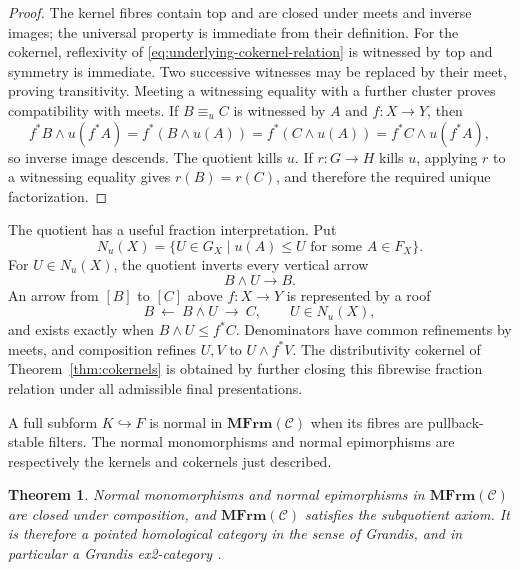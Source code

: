 \documentclass[12pt,oneside,reqno]{amsart}
\newtheorem{theorem}{Theorem}[section]
\theoremstyle{definition}
\theoremstyle{remark}
\newcommand{\C}{\mathcal C}
\newcommand{\MFrm}{\mathbf{MFrm}}
\begin{document}
\begin{proof}
The kernel fibres contain top and are closed under meets and inverse
images; the universal property is immediate from their definition.
For the cokernel, reflexivity of \eqref{eq:underlying-cokernel-relation}
is witnessed by top and symmetry is immediate.  Two successive
witnesses may be replaced by their meet, proving transitivity.  Meeting
a witnessing equality with a further cluster proves compatibility with
meets.  If \(B\equiv_uC\) is witnessed by \(A\) and \(f:X\to Y\), then
\[
 f^*B\wedge u(f^*A)
 =f^*(B\wedge u(A))
 =f^*(C\wedge u(A))
 =f^*C\wedge u(f^*A),
\]
so inverse image descends.  The quotient kills \(u\).  If \(r:G\to H\)
kills \(u\), applying \(r\) to a witnessing equality gives
\(r(B)=r(C)\), and therefore the required unique factorization.
\end{proof}

The quotient has a useful fraction interpretation.  Put
\[
 N_u(X)=\{U\in G_X\mid u(A)\leqslant U
                    \text{ for some }A\in F_X\}.
\]
For \(U\in N_u(X)\), the quotient inverts every vertical arrow
\[
                         B\wedge U\longrightarrow B.
\]
An arrow from \([B]\) to \([C]\) above \(f:X\to Y\) is represented by
a roof
\[
 B\ \longleftarrow\ B\wedge U\ \longrightarrow\ C,
 \qquad U\in N_u(X),
\]
and exists exactly when \(B\wedge U\leqslant f^*C\).  Denominators
have common refinements by meets, and composition refines \(U,V\) to
\(U\wedge f^*V\).  The distributivity cokernel of
Theorem~\ref{thm:cokernels} is obtained by further closing this
fibrewise fraction relation under all admissible final presentations.

A full subform \(K\hookrightarrow F\) is normal in \(\MFrm(\C)\) when
its fibres are pullback-stable filters.  The normal monomorphisms and
normal epimorphisms are respectively the kernels and cokernels just
described.

\begin{theorem}\label{thm:underlying-homological}
Normal monomorphisms and normal epimorphisms in \(\MFrm(\C)\) are
closed under composition, and \(\MFrm(\C)\) satisfies the subquotient
axiom.  It is therefore a pointed homological category in the sense of
Grandis, and in particular a Grandis ex2-category
\cite{GrandisBook,JanelidzeWeighillII}.
\end{theorem}
\end{document}
